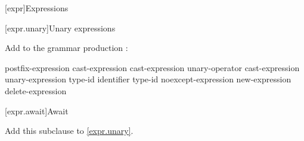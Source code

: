 

[expr]{Expressions}

\setcounter{section}{2}
[expr.unary]{Unary expressions}


Add  to the grammar production :

\begin{bnf}
	\br
	postfix-expression\br
	\terminal{++} cast-expression\br
	\terminal{-{-}} cast-expression\br
	\br
	unary-operator cast-expression\br
	 unary-expression\br
	 type-id \terminal{)}\br
	 \terminal{(} identifier \terminal{)}\br
	 type-id \terminal{)}\br
	noexcept-expression\br
	new-expression\br
	delete-expression\br
\end{bnf}

%
%
%

\setcounter{subsection}{7}
[expr.await]{Await}

Add this subclause to \ref{expr.unary}.

